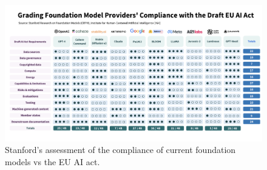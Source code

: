 \begin{figure}[htbp]
    \centering
    \includegraphics{euaicompliance}
    \caption{Stanford's assessment of the compliance of current foundation models vs the EU AI act.}
    \label{fig:euAIcompliance}
\end{figure}

